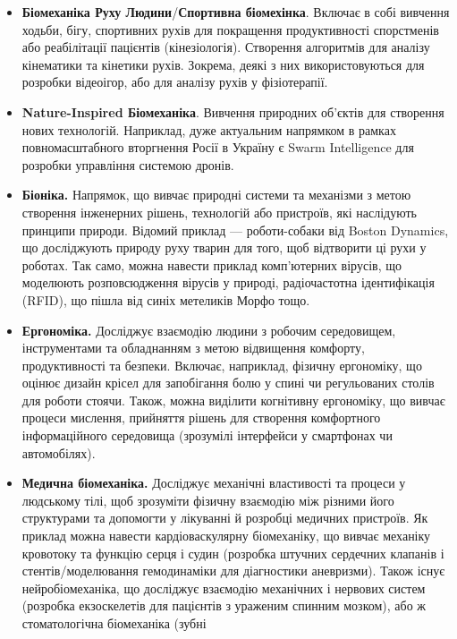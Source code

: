 \documentclass{hw_template}
\begin{document}
\begin{itemize}
    \item \textbf{Біомеханіка Руху Людини}/\textbf{Спортивна біомехінка}.
    Включає в собі вивчення ходьби, бігу, спортивних рухів для покращення
    продуктивності спорстменів або реабілітації пацієнтів (кінезіологія).
    Створення алгоритмів для аналізу кінематики та кінетики рухів. Зокрема,
    деякі з них використовуються для розробки відеоігор, або для аналізу рухів у
    фізіотерапії.
    \item \textbf{Nature-Inspired Біомеханіка}. Вивчення природних об'єктів для
    створення нових технологій. Наприклад, дуже актуальним напрямком в рамках
    повномасштабного вторгнення Росії в Україну є Swarm Intelligence для
    розробки управління системою дронів. 
    \item \textbf{Біоніка.} Напрямок, що вивчає природні системи та механізми 
    з метою створення інженерних рішень, технологій або пристроїв, які наслідують 
    принципи природи. Відомий приклад --- роботи-собаки від Boston Dynamics, що
    досліджують природу руху тварин для того, щоб відтворити ці рухи у роботах. Так
    само, можна навести приклад комп'ютерних вірусів, що моделюють розповсюдження
    вірусів у природі, радіочастотна ідентифікація (RFID), що пішла від синіх 
    метеликів Морфо тощо. 
    \item \textbf{Ергономіка.} Досліджує взаємодію людини з робочим середовищем,
    інструментами та обладнанням з метою відвищення комфорту, продуктивності 
    та безпеки. Включає, наприклад, фізичну ергономіку, що оцінює дизайн 
    крісел для запобігання болю у спині чи регульованих столів для роботи стоячи.
    Також, можна виділити когнітивну ергономіку, що вивчає процеси мислення,
    прийняття рішень для створення комфортного інформаційного середовища (зрозумілі 
    інтерфейси у смартфонах чи автомобілях).
    \item \textbf{Медична біомеханіка.} Досліджує механічні властивості та
    процеси у людському тілі, щоб зрозуміти фізичну взаємодію між різними його
    структурами та допомогти у лікуванні й розробці медичних пристроїв. Як приклад 
    можна навести кардіоваскулярну біомеханіку, що вивчає механіку кровотоку 
    та функцію серця і судин (розробка штучних сердечних клапанів і стентів/моделювання
    гемодинаміки для діагностики аневризми). Також існує нейробіомеханіка, що
    досліджує взаємодію механічних і нервових систем (розробка екзоскелетів для
    пацієнтів з ураженим спинним мозком), або ж стоматологічна біомеханіка (зубні 

\end{itemize}
\end{document}
